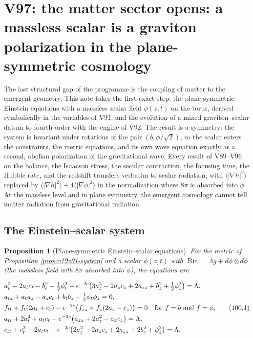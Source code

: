 \documentclass[11pt]{article}
\newtheorem{proposition}[theorem]{Proposition}
\theoremstyle{remark}
\begin{document}
\section{V97: the matter sector opens: a massless scalar is a graviton polarization in the plane-symmetric cosmology}
\label{sec:v19v97}

The last structural gap of the programme is the coupling of matter
to the emergent geometry.  This note takes the first exact step: the
plane-symmetric Einstein equations with a massless scalar field
\(\phi(z,t)\) on the torus, derived symbolically in the variables of
V91, and the evolution of a mixed graviton--scalar datum to fourth
order with the engine of V92.  The result is a symmetry: the system
is invariant under rotations of the pair \((b,\phi/\sqrt2)\), so the
scalar enters the constraints, the metric equations, and its own wave
equation exactly as a second, abelian polarization of the
gravitational wave.  Every result of V89--V96 on the balance, the
Isaacson stress, the secular contraction, the focusing time, the
Hubble rate, and the redshift transfers verbatim to scalar radiation,
with \(\langle|\nabla h|^2\rangle\) replaced by
\(\langle|\nabla h|^2\rangle+4\langle|\nabla\phi|^2\rangle\) in the
normalization where \(8\pi\) is absorbed into \(\phi\).  At the
massless level and in plane symmetry, the emergent cosmology cannot
tell matter radiation from gravitational radiation.

\subsection{The Einstein--scalar system}

\begin{proposition}[Plane-symmetric Einstein--scalar equations]
\label{prop:v19v97-system}
For the metric of Proposition \ref{prop:v19v91-system} and a scalar
\(\phi(z,t)\) with \(\operatorname{Ric}=\Lambda g+d\phi\otimes d\phi\)
(the massless field with \(8\pi\) absorbed into \(\phi\)), the
equations are

\[
\begin{aligned}
 &a_t^2+2a_tc_t-b_t^2-\tfrac12\phi_t^2-e^{-2c}\bigl(3a_z^2-2a_zc_z+2a_{zz}+b_z^2+\tfrac12\phi_z^2\bigr)=\Lambda,\\
 &a_{tz}+a_ta_z-a_zc_t+b_tb_z+\tfrac12\phi_t\phi_z=0,\\
 &f_{tt}+f_t(2a_t+c_t)-e^{-2c}\bigl(f_{zz}+f_z(2a_z-c_z)\bigr)=0\quad\hbox{for }f=b\hbox{ and }f=\phi,\\
 &a_{tt}+2a_t^2+a_tc_t-e^{-2c}\bigl(a_{zz}+2a_z^2-a_zc_z\bigr)=\Lambda,\\
 &c_{tt}+c_t^2+2a_tc_t-e^{-2c}\bigl(2a_z^2-2a_zc_z+2a_{zz}+2b_z^2+\phi_z^2\bigr)=\Lambda.
\end{aligned}                                                          \tag{100.1}
\]
\end{proposition}
\end{document}
